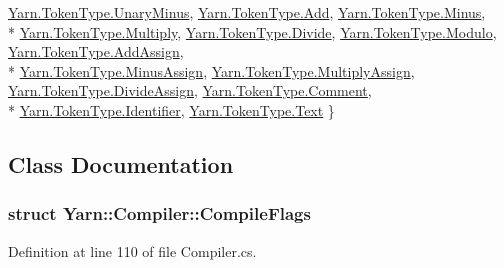 \begin{DoxyCompactItemize}
\hyperlink{a00050_a301aa7c866593a5b625a8fc158bbeacea87c80963dae5cd099e3a377e4d314b20}{Yarn.\-Token\-Type.\-Unary\-Minus}, 
\hyperlink{a00050_a301aa7c866593a5b625a8fc158bbeaceaec211f7c20af43e742bf2570c3cb84f9}{Yarn.\-Token\-Type.\-Add}, 
\hyperlink{a00050_a301aa7c866593a5b625a8fc158bbeacea453fb623e752c5993f65bc410fd74fe5}{Yarn.\-Token\-Type.\-Minus}, 
\\*
\hyperlink{a00050_a301aa7c866593a5b625a8fc158bbeaceae257376d913f3b53cbb4a9b19d770648}{Yarn.\-Token\-Type.\-Multiply}, 
\hyperlink{a00050_a301aa7c866593a5b625a8fc158bbeacea0b914e196182d02615487e9793ecff3d}{Yarn.\-Token\-Type.\-Divide}, 
\hyperlink{a00050_a301aa7c866593a5b625a8fc158bbeacea4cde2424cf960a70b7fc5fda1119143d}{Yarn.\-Token\-Type.\-Modulo}, 
\hyperlink{a00050_a301aa7c866593a5b625a8fc158bbeaceab055bb9ca4c2fabe4be4aa6e9e3278c6}{Yarn.\-Token\-Type.\-Add\-Assign}, 
\\*
\hyperlink{a00050_a301aa7c866593a5b625a8fc158bbeaceab05d460746c046306a3b74039a9977ba}{Yarn.\-Token\-Type.\-Minus\-Assign}, 
\hyperlink{a00050_a301aa7c866593a5b625a8fc158bbeacea7c3dfbd9bd6620d1cde7bbad4750a9c4}{Yarn.\-Token\-Type.\-Multiply\-Assign}, 
\hyperlink{a00050_a301aa7c866593a5b625a8fc158bbeacea60776f3f45a828ebfd062b8ad8118b38}{Yarn.\-Token\-Type.\-Divide\-Assign}, 
\hyperlink{a00050_a301aa7c866593a5b625a8fc158bbeacea0be8406951cdfda82f00f79328cf4efc}{Yarn.\-Token\-Type.\-Comment}, 
\\*
\hyperlink{a00050_a301aa7c866593a5b625a8fc158bbeacea29ee5d1ebcc033234938a5234f1f2075}{Yarn.\-Token\-Type.\-Identifier}, 
\hyperlink{a00050_a301aa7c866593a5b625a8fc158bbeacea9dffbf69ffba8bc38bc4e01abf4b1675}{Yarn.\-Token\-Type.\-Text}
 \}
\end{DoxyCompactItemize}


\subsection{Class Documentation}
\label{a00350}
\hypertarget{a00053_a00350}{}
\subsubsection{struct Yarn\-:\-:Compiler\-:\-:Compile\-Flags}


Definition at line 110 of file Compiler.\-cs.



